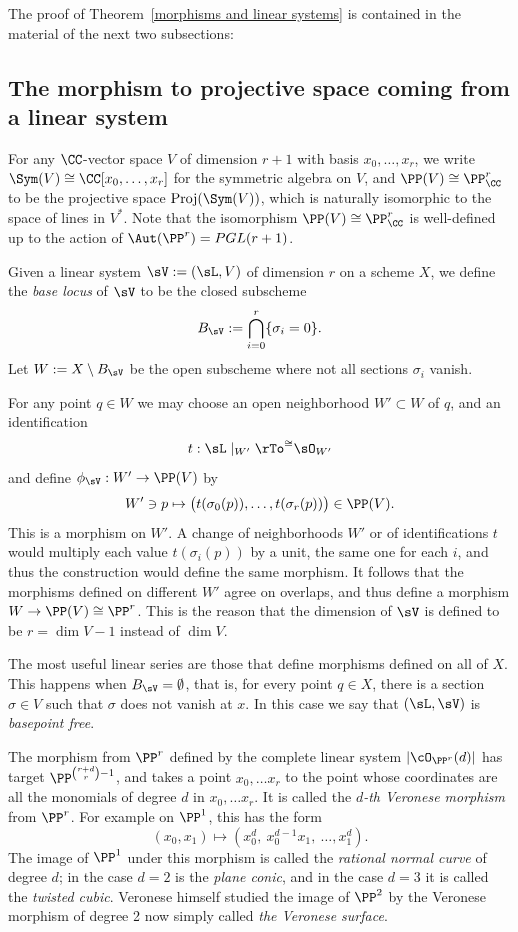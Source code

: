 The proof of Theorem~\ref{morphisms and linear systems} is contained in the material of the next two subsections:

\subsection{The morphism to projective space coming from a linear system} 
For any $\CC$-vector space $V$ of dimension $r+1$ with basis $x_{0}, \dots, x_{r}$, we write $\Sym(V) \cong \CC[x_{0},\dots, x_{r}]$ for the symmetric algebra on $V$, and
$\PP(V)\cong \PP^{r}_{\CC}$ to be the projective space ${\rm Proj}(\Sym(V))$, which is naturally isomorphic to the
space of lines in $V^{*}$. Note that the isomorphism $\PP(V)\cong \PP^{r}_{\CC}$ is well-defined up to the action
of $\Aut(\PP^r) = PGL(r+1)$.


Given a linear system $\sV:=(\sL, V)$  of dimension $r$ on a scheme $X$, 
we define the \emph{base locus} of $\sV$ to be the closed subscheme 
$$
B_\sV := \bigcap_{i= 0}^{r}\{\sigma_{i} = 0\}.
$$
Let $W:=X\setminus B_\sV$ be the open subscheme where not all sections $\sigma_{i}$ vanish.

For any point $q\in W$ we  may choose an open neighborhood $W'\subset W$ of $q$, and an identification 
$$
t: \sL\mid_{W'} \rTo^{\cong} \sO_{W'}
$$
and define $\phi_{\sV}: W' \to \PP(V)$ by 
$$
W'\ni p \mapsto \bigl(t(\sigma_{0}(p)),\dots, t(\sigma_{r}(p))\bigr) \in \PP(V).
$$
This  is a morphism on $W'$. A change of neighborhoods $W'$ or of identifications $t$ would multiply
each value $t(\sigma_{i}(p))$ by a unit, the same one for each $i$, and thus the construction would define the same morphism. It follows that the morphisms
defined on different $W'$ agree on overlaps, and thus define a morphism $W \to \PP(V) \cong \PP^r$. This is the reason
that the dimension of $\sV$ is defined to be $r=\dim V -1$ instead of $\dim V$.

The most useful linear series are those that define morphisms defined on all of $X$. This happens when $B_\sV = \emptyset$,
that is, for every point $q\in X$, there is a section $\sigma \in V$ such that $\sigma$ does not vanish at $x$. In this case we say that $(\sL, \sV)$ is \emph{basepoint free}.

\begin{example}\label{Veronese definition}
The morphism from $\PP^r$ defined by the complete linear system $|\cO_{\PP^r}(d)|$ has target
$\PP^{{r+d\choose r}-1}$, and takes a point $x_0,\dots x_r$ to the point whose coordinates are all the monomials of
degree $d$ in $x_0,\dots x_r$. It is called the \emph{$d$-th Veronese morphism} from $\PP^r$. For example on $\PP^1$, this has the form
$$
(x_0,x_1) \mapsto (x_0^d,\ x_0^{d-1}x_1,\ \dots,x_1^d).
$$
The image of $\PP^1$ under this morphism is called the \emph{rational normal curve} of degree $d$; in the case $d=2$ is the
\emph{plane conic}, and in the case $d=3$ it is called the \emph{twisted cubic}. Veronese himself studied the image of $\PP^2$
by the Veronese morphism of degree 2 now simply called \emph{the Veronese surface}.
\end{example}

